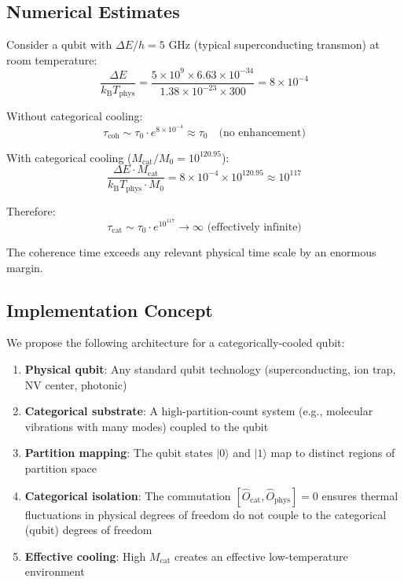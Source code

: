 \documentclass[twocolumn,10pt,twoside]{article}
\newcommand{\kb}{k_{\mathrm{B}}}
\newcommand{\Ocat}{\hat{O}_{\mathrm{cat}}}
\newcommand{\Ophys}{\hat{O}_{\mathrm{phys}}}
\newcommand{\Tphys}{T_{\mathrm{phys}}}
\newcommand{\Mcat}{M_{\mathrm{cat}}}
\begin{document}
\subsection{Numerical Estimates}

Consider a qubit with $\Delta E / h = 5$ GHz (typical superconducting transmon) at room temperature:
\begin{equation}
\frac{\Delta E}{\kb \Tphys} = \frac{5 \times 10^9 \times 6.63 \times 10^{-34}}{1.38 \times 10^{-23} \times 300} = 8 \times 10^{-4}
\end{equation}

Without categorical cooling:
\begin{equation}
\tau_{\text{coh}} \sim \tau_0 \cdot e^{8 \times 10^{-4}} \approx \tau_0 \quad \text{(no enhancement)}
\end{equation}

With categorical cooling ($\Mcat/M_0 = 10^{120.95}$):
\begin{equation}
\frac{\Delta E \cdot \Mcat}{\kb \Tphys \cdot M_0} = 8 \times 10^{-4} \times 10^{120.95} \approx 10^{117}
\end{equation}

Therefore:
\begin{equation}
\tau_{\text{cat}} \sim \tau_0 \cdot e^{10^{117}} \to \infty \text{ (effectively infinite)}
\end{equation}

The coherence time exceeds any relevant physical time scale by an enormous margin.

\subsection{Implementation Concept}

We propose the following architecture for a categorically-cooled qubit:

\begin{enumerate}
    \item \textbf{Physical qubit}: Any standard qubit technology (superconducting, ion trap, NV center, photonic)

    \item \textbf{Categorical substrate}: A high-partition-count system (e.g., molecular vibrations with many modes) coupled to the qubit

    \item \textbf{Partition mapping}: The qubit states $|0\rangle$ and $|1\rangle$ map to distinct regions of partition space

    \item \textbf{Categorical isolation}: The commutation $[\Ocat, \Ophys] = 0$ ensures thermal fluctuations in physical degrees of freedom do not couple to the categorical (qubit) degrees of freedom

    \item \textbf{Effective cooling}: High $\Mcat$ creates an effective low-temperature environment
\end{enumerate}
\end{document}
